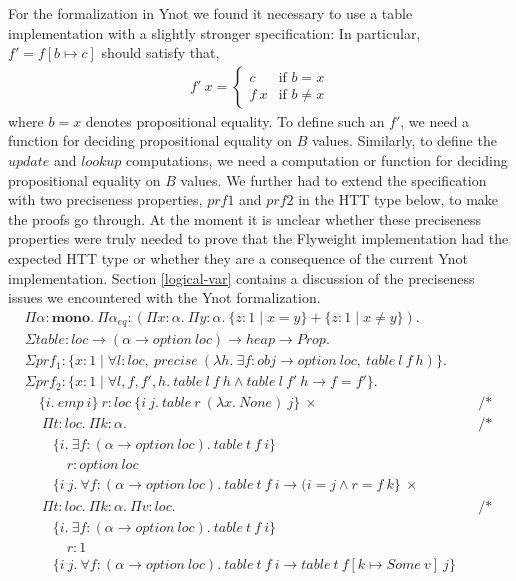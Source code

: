 \documentclass[a4paper,english]{article}
\newcommand{\HEAP}[0]{heap}
\newcommand{\PROP}[0]{Prop}
\newcommand{\MONO}[0]{\mathbf{mono}}
\newcommand{\LOC}[0]{loc}
\newcommand{\OPTION}[0]{option}
\newcommand{\pname}[1]{\texttt{/* #1 */}}
\begin{document}
For the formalization in Ynot we found it necessary to use a table
implementation with a slightly stronger specification: In particular,
$f' = f[b \mapsto c]$ should satisfy that,
\begin{align*}
f'\ x = 
\begin{cases}
c & \text{if $b = x$}\\
f\ x & \text{if $b \neq x$}
\end{cases}
\end{align*}
where $b = x$ denotes propositional equality. To define such an $f'$, we need a
function for deciding propositional equality on $B$ values. Similarly, to
define the $update$ and $lookup$ computations, we need a computation or
function for deciding propositional equality on $B$ values. We further had to
extend the specification with two preciseness properties, $prf1$ and $prf2$ in
the HTT type below, to make the proofs go through. At the moment it is unclear
whether these preciseness properties were truly needed to prove that the
Flyweight implementation had the expected HTT type or whether they are a
consequence of the current Ynot implementation. Section \ref{logical-var}
contains a discussion of the preciseness issues we encountered with the Ynot
formalization.  
\begin{align*}
&\Pi \alpha : \MONO.\ \Pi \alpha_{eq} : (\Pi x : \alpha.\ \Pi y : \alpha.\ \{ z : 1 \mid x = y \} + \{ z : 1 \mid x \neq y \}).\\
&\Sigma table : \LOC \rightarrow (\alpha \rightarrow \OPTION\ \LOC) \rightarrow \HEAP \rightarrow \PROP.\\
&\Sigma prf_1 : \{ x : 1 \mid \forall l : \LOC,\ precise\ (\lambda h.\ \exists f : obj \rightarrow \OPTION\ \LOC,\ table\ l\ f\ h) \}.\\
&\Sigma prf_2 : \{ x : 1 \mid \forall l, f, f', h.\ table\ l\ f\ h \land table\ l\ f'\ h \rightarrow f = f' \}.\\
&\quad \{ i.\ emp\ i \}\ r : \LOC\ \{ i\ j.\ table\ r\ (\lambda x.\ None)\ j \}\ \times && \pname{newtable}\\
&\quad\ \Pi t : \LOC.\ \Pi k : \alpha. && \pname{lookup}\\
&\quad\quad \{ i.\ \exists f : (\alpha \rightarrow \OPTION\ \LOC).\ table\ t\ f\ i \}\\
&\quad\quad\quad r : \OPTION\ \LOC\\
&\quad\quad \{ i\ j.\ \forall f : (\alpha \rightarrow \OPTION\ \LOC).\ table\ t\ f\ i \rightarrow (i = j \land r = f\ k \}\ \times\\
&\quad\ \Pi t : \LOC.\ \Pi k : \alpha.\ \Pi v : \LOC. && \pname{update}\\
&\quad\quad \{ i.\ \exists f : (\alpha \rightarrow \OPTION\ \LOC).\ table\ t\ f\ i \}\\
&\quad\quad\quad r : 1\\
&\quad\quad \{ i\ j.\ \forall f : (\alpha \rightarrow \OPTION\ \LOC).\ table\ t\ f\ i \rightarrow table\ t\ f[k \mapsto Some\ v]\ j \}
\end{align*}
\end{document}
